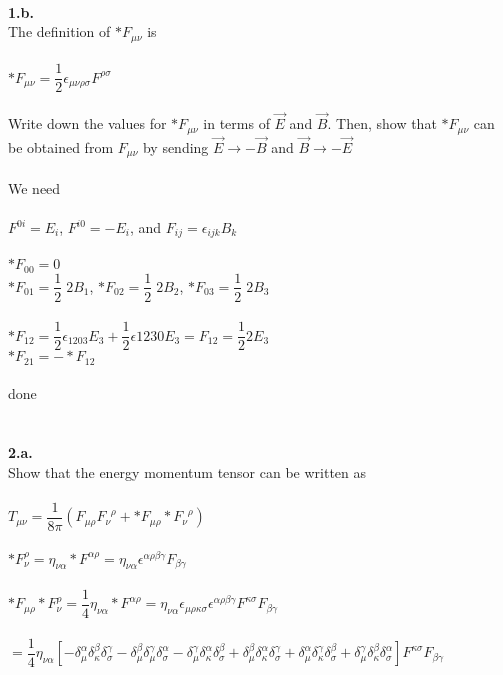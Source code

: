 \documentclass[prb,preprint]
{revtex4-1}
\newcommand{\PRLsep}{\noindent\makebox[\linewidth]{\resizebox{0.8888\linewidth}{2pt}{$\bullet$}}\bigskip}
\begin{document}
\PRLsep
\\
\newpage
\textbf{1.b.}
\\
The definition of $*F_{\mu\nu}$ is 
\\
\\
$*F_{\mu\nu} = \dfrac{1}{2}\epsilon_{\mu\nu\rho\sigma}F^{\rho\sigma}$
\\
\\
Write down the values for $*F_{\mu\nu}$ in terms of $\vec{E}$ and $\vec{B}$.  Then, show that $*F_{\mu\nu}$ can be obtained from $F_{\mu\nu}$ by sending $\vec{E} \rightarrow -\vec{B}$ and $\vec{B} \rightarrow -\vec{E}$ 
\\
\\
We need
\\
\\
$F^{0i} = E_i$, $F^{i0} = -E_i$, and $F_{ij} = \epsilon_{ijk}B_k$
\\
\\
$*F_{00} = 0$
\\
$*F_{01} = \dfrac{1}{2}\;2B_1$, $*F_{02} = \dfrac{1}{2}\;2B_2$, $*F_{03} = \dfrac{1}{2}\;2B_3$
\\
\\
$*F_{12} = \dfrac{1}{2}\epsilon_{1203}E_3 + \dfrac{1}{2}\epsilon{1230}E_3 = F_{12} = \dfrac{1}{2}2E_3$
\\
$*F_{21} = -*F_{12}$
\\
\\
done
\\
\\
\PRLsep
\\
\newpage
\textbf{2.a.}
\\
Show that the energy momentum tensor can be written as 
\\
\\
$T_{\mu\nu} = \dfrac{1}{8\pi}\left(F_{\mu\rho}F_\nu^{\;\;\rho}+*F_{\mu\rho}*F_\nu^{\;\;\rho}\right)$
\\
\\
$*F_\nu^\rho = \eta_{\nu\alpha}*F^{\alpha\rho} = \eta_{\nu\alpha}\epsilon^{\alpha\rho\beta\gamma}F_{\beta\gamma}$
\\
\\
$*F_{\mu\rho}*F_\nu^\rho = \dfrac{1}{4}\eta_{\nu\alpha}*F^{\alpha\rho} = \eta_{\nu\alpha}\epsilon_{\mu\rho\kappa\sigma}\epsilon^{\alpha\rho\beta\gamma}F^{\kappa\sigma}F_{\beta\gamma}$
\\
\\
$= \dfrac{1}{4}\eta_{\nu\alpha}\left[-\delta_\mu^\alpha \delta_\kappa^\beta \delta_\sigma^\gamma - \delta_\mu^\beta \delta_\mu^\gamma \delta_\sigma^\alpha - \delta_\mu^\gamma \delta_\kappa^\alpha \delta_\sigma^\beta + \delta_\mu^\beta \delta_\kappa^\alpha \delta_\sigma^\gamma + \delta_\mu^\alpha \delta_\kappa^\gamma \delta_\sigma^\beta + \delta_\mu^\gamma \delta_\kappa^\beta \delta_\sigma^\alpha \right]F^{\kappa\sigma}F_{\beta\gamma}$
\end{document}
